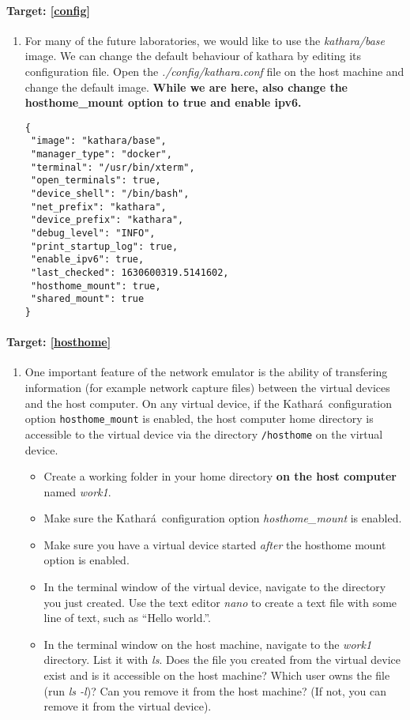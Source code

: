 \documentclass[12pt]{book}
\newcommand{\kathara}{Kathar\'a}
\begin{document}
\paragraph{Target: \ref{config}}

\begin{enumerate}[resume*]
\item For many of the future laboratories, we would like to use the \emph{kathara/base} image. We can change the default behaviour of kathara by editing its configuration file. Open the \emph{./config/kathara.conf} file on the host machine and change the default image. \textbf{While we are here, also change the hosthome\_mount option to true and enable ipv6.}
\begin{lstlisting}
{
 "image": "kathara/base",
 "manager_type": "docker",
 "terminal": "/usr/bin/xterm",
 "open_terminals": true,
 "device_shell": "/bin/bash",
 "net_prefix": "kathara",
 "device_prefix": "kathara",
 "debug_level": "INFO",
 "print_startup_log": true,
 "enable_ipv6": true,
 "last_checked": 1630600319.5141602,
 "hosthome_mount": true,
 "shared_mount": true
}
\end{lstlisting}
\end{enumerate}

\paragraph{Target: \ref{hosthome}}

\begin{enumerate}[resume*]
\item One important feature of the network emulator is the ability of transfering information (for example network capture files) between the virtual devices and the host computer. On any virtual device, if the \kathara\ configuration option \verb$hosthome_mount$ is enabled, the host computer home directory is accessible to the virtual device via the directory \verb$/hosthome$ on the virtual device.

  \begin{itemize}[label=--]
  \item Create a working folder in your home directory \textbf{on the host computer} named \emph{work1}.
  \item Make sure the \kathara\ configuration option \emph{hosthome\_mount} is enabled.
  \item Make sure you have a virtual device started \emph{after} the hosthome mount option is enabled.
  \item In the terminal window of the virtual device, navigate to the directory you just created. Use the text editor \emph{nano} to create a text file with some line of text, such as ``Hello world.''.
  \item In the terminal window on the host machine, navigate to the \emph{work1} directory. List it with \emph{ls}. Does the file you created from the virtual device exist and is it accessible on the host machine? Which user owns the file (run \emph{ls -l})? Can you remove it from the host machine? (If not, you can remove it from the virtual device).
  \end{itemize}

\end{enumerate}
\end{document}
